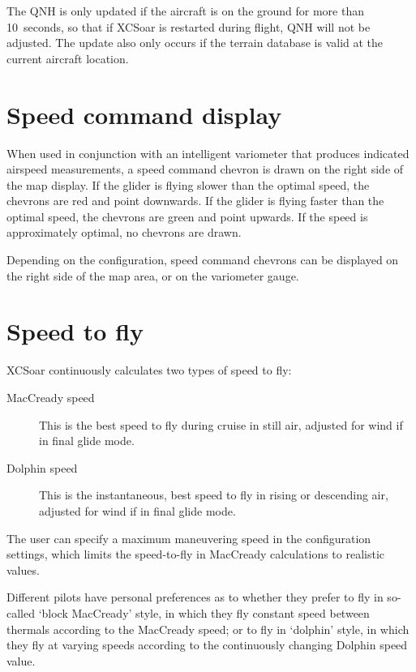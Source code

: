 The QNH is only updated if the aircraft is on the ground for more than
10~seconds, so that if XCSoar is restarted during flight, QNH will not
be adjusted.  The update also only occurs if the terrain database is
valid at the current aircraft location.

\section{Speed command display}

When used in conjunction with an intelligent variometer that produces
indicated airspeed measurements, a speed command chevron is drawn
on the right side of the map display.  If the glider is flying slower
than the optimal speed, the chevrons are red and point downwards.  If
the glider is flying faster than the optimal speed, the chevrons are
green and point upwards.  If the speed is approximately optimal, no
chevrons are drawn.


Depending on the configuration, speed command chevrons can be
displayed on the right side of the map area, or on the variometer
gauge.


\section{Speed to fly}\label{sec:stf}

XCSoar continuously calculates two types of speed to fly:
\begin{description}
\item[MacCready speed]  This is the best speed to fly during cruise
  in still air, adjusted for wind if in final glide mode.
\item[Dolphin speed]  This is the instantaneous, best speed to fly
  in rising or descending air, adjusted for wind if in final glide
  mode.
\end{description}  

The user can specify a maximum maneuvering speed in the configuration
settings, which limits the speed-to-fly in MacCready calculations to
realistic values.

Different pilots have personal preferences as to whether they prefer
to fly in so-called `block MacCready' style, in which they fly
constant speed between thermals according to the MacCready speed; or
to fly in `dolphin' style, in which they fly at varying speeds
according to the continuously changing Dolphin speed value.

